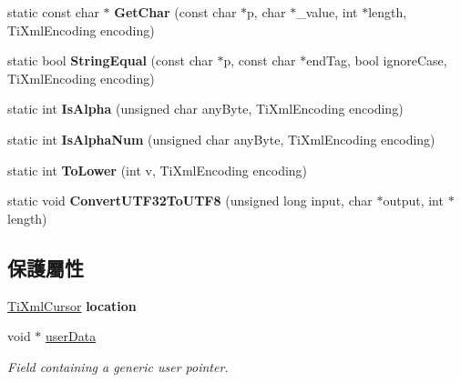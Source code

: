 \begin{DoxyCompactItemize}
\item 
static const char $\ast$ {\bfseries Get\+Char} (const char $\ast$p, char $\ast$\+\_\+value, int $\ast$length, Ti\+Xml\+Encoding encoding)\hypertarget{class_ti_xml_base_a5b0fde72d6f662ae1fd6303195d2159b}{}\label{class_ti_xml_base_a5b0fde72d6f662ae1fd6303195d2159b}

\item 
static bool {\bfseries String\+Equal} (const char $\ast$p, const char $\ast$end\+Tag, bool ignore\+Case, Ti\+Xml\+Encoding encoding)\hypertarget{class_ti_xml_base_a51631e6986179558b9e5850723ed165a}{}\label{class_ti_xml_base_a51631e6986179558b9e5850723ed165a}

\item 
static int {\bfseries Is\+Alpha} (unsigned char any\+Byte, Ti\+Xml\+Encoding encoding)\hypertarget{class_ti_xml_base_ae22522b2e8e1ac43102d16394f639fc8}{}\label{class_ti_xml_base_ae22522b2e8e1ac43102d16394f639fc8}

\item 
static int {\bfseries Is\+Alpha\+Num} (unsigned char any\+Byte, Ti\+Xml\+Encoding encoding)\hypertarget{class_ti_xml_base_a321919055c115c78ded17f85a793f368}{}\label{class_ti_xml_base_a321919055c115c78ded17f85a793f368}

\item 
static int {\bfseries To\+Lower} (int v, Ti\+Xml\+Encoding encoding)\hypertarget{class_ti_xml_base_a799f17405a86a5c2029618e85f11a097}{}\label{class_ti_xml_base_a799f17405a86a5c2029618e85f11a097}

\item 
static void {\bfseries Convert\+U\+T\+F32\+To\+U\+T\+F8} (unsigned long input, char $\ast$output, int $\ast$length)\hypertarget{class_ti_xml_base_a07c765e3a7f979d343e646ea797b180b}{}\label{class_ti_xml_base_a07c765e3a7f979d343e646ea797b180b}

\end{DoxyCompactItemize}
\subsection*{保護屬性}
\begin{DoxyCompactItemize}
\item 
\hyperlink{struct_ti_xml_cursor}{Ti\+Xml\+Cursor} {\bfseries location}\hypertarget{class_ti_xml_base_a0d992580f3bc264909f898e942677a3c}{}\label{class_ti_xml_base_a0d992580f3bc264909f898e942677a3c}

\item 
void $\ast$ \hyperlink{class_ti_xml_base_ab242c01590191f644569fa89a080d97c}{user\+Data}\hypertarget{class_ti_xml_base_ab242c01590191f644569fa89a080d97c}{}\label{class_ti_xml_base_ab242c01590191f644569fa89a080d97c}

\begin{DoxyCompactList}\small\item\em Field containing a generic user pointer. \end{DoxyCompactList}\end{DoxyCompactItemize}
